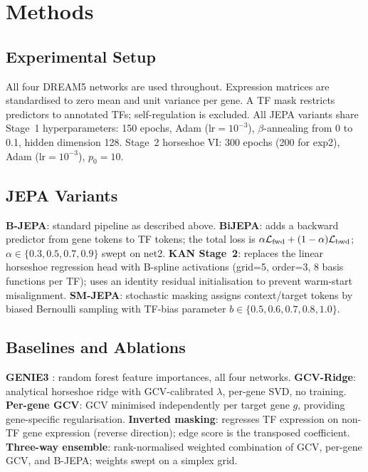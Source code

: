 \documentclass[11pt]{article}
\begin{document}
\section{Methods}

\subsection{Experimental Setup}

All four DREAM5 networks are used throughout.
Expression matrices are standardised to zero mean and unit variance per gene.
A TF mask restricts predictors to annotated TFs; self-regulation is excluded.
All JEPA variants share Stage~1 hyperparameters: 150 epochs, Adam
($\mathrm{lr}=10^{-3}$), $\beta$-annealing from 0 to 0.1, hidden dimension 128.
Stage~2 horseshoe VI: 300 epochs (200 for exp2), Adam ($\mathrm{lr}=10^{-3}$),
$p_0 = 10$.

\subsection{JEPA Variants}

\textbf{B-JEPA}: standard pipeline as described above.
\textbf{BiJEPA}: adds a backward predictor from gene tokens to TF tokens; the
total loss is $\alpha \mathcal{L}_{\rm fwd} + (1-\alpha)\mathcal{L}_{\rm bwd}$;
$\alpha \in \{0.3, 0.5, 0.7, 0.9\}$ swept on net2.
\textbf{KAN Stage~2}: replaces the linear horseshoe regression head with
B-spline activations (grid=5, order=3, 8 basis functions per TF); uses an
identity residual initialisation to prevent warm-start misalignment.
\textbf{SM-JEPA}: stochastic masking assigns context/target tokens by biased
Bernoulli sampling with TF-bias parameter $b \in \{0.5, 0.6, 0.7, 0.8, 1.0\}$.

\subsection{Baselines and Ablations}

\textbf{GENIE3} \citep{huynh2010}: random forest feature importances, all four
networks.
\textbf{GCV-Ridge}: analytical horseshoe ridge with GCV-calibrated $\lambda$,
per-gene SVD, no training.
\textbf{Per-gene GCV}: GCV minimised independently per target gene $g$,
providing gene-specific regularisation.
\textbf{Inverted masking}: regresses TF expression on non-TF gene expression
(reverse direction); edge score is the transposed coefficient.
\textbf{Three-way ensemble}: rank-normalised weighted combination of GCV,
per-gene GCV, and B-JEPA; weights swept on a simplex grid.
\end{document}
